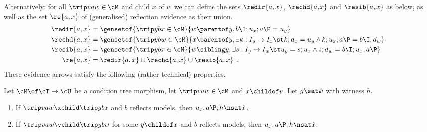 Alternatively: for all $\trip vaw\in\cM$ and child $x$ of $v$, we can define the sets $\redir{a,x}$, $\rechd{a,x}$ and $\resib{a,x}$ as below, as well as the set $\re{a,x}$ of (generalised) reflection evidence as their union.
%
\begin{align*}
\redir{a,x} ={} & \gensetof{\trip ybx\in \cM}{w\parentof y, b\I;u_x;a\P=u_y} \\
\rechd{a,x} ={} & \gensetof{\trip ybw\in \cM}{x\parentof y, \exists k:I_y\to I_x\st k;d_x=u_y\wedge k;u_x;a\P=b\I;d_w} \\
\resib{a,x} ={} & \gensetof{\trip ybx\in \cM}{w\sibling y, \exists s:I_y\to I_w\st u_y=s;u_x \wedge s;d_w=b\I;u_x;a\P} \\
\re{a,x} ={} & \redir{a,x}\cup \rechd{a,x} \cup \resib{a,x} \enspace.
\end{align*}
%
These evidence arrows satisfy the following (rather technical) properties.
%
\begin{lemma}\label{lem:evidence}
Let  $\cM\of \cT\to\cU$ be a condition tree morphism, let $\trip vaw\in\cM$ and $x\childof v$. Let $g\sat \hat w$ with witness $h$.
\begin{enumerate}[topsep=\itemsep]
\item\label{re-dir} If $\trip vaw \xchild \trip ybx$ and $b$ reflects models, then $u_x;a\P;h\nsat \hat x$.
\item\label{re-chd} If $\trip vaw \vchild \trip ybw$ for some $y\childof x$ and $b$ reflects models, then $u_x;a\P;h\nsat \hat x$.
\end{enumerate}
\end{lemma}
%
\begin{comment}
\begin{lemma}\label{lem:evidence}
Let  $\cM\of \cT\to\cU$ be a condition tree morphism, let $\trip vaw\in\cM$ and $x\childof v$. Let $g\sat \hat w$ with witness $h$.
\begin{enumerate}[topsep=\itemsep]
\item\label{re-dir} If $\trip ybx\in \redir{a,x}$ and $b$ reflects models, then $u_x;a\P;h\nsat \hat x$.
\item\label{re-chd} If $\trip ybw\in \rechd{a,x}$ and $b$ reflects models, then $u_x;a\P;h\nsat \hat x$.
\item\label{re-sib} If $\trip ybx\in \resib{a,x}$ and $b$ reflects models, then either there is a sibling $w'\sibling w$ with a morphism $s'\of I_{w'}\to I_w$ such that $u_{w'}=s';u_w$ and $s';g\sat \hat w'$, or $u_x;a\P;h\nsat \hat x$.
\end{enumerate}
\end{lemma}
\end{comment}
